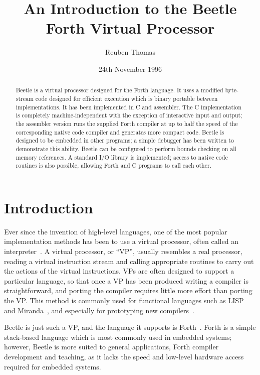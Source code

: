 \documentclass{article}
\title{An Introduction to the Beetle Forth Virtual Processor}
\author{Reuben Thomas}
\date{24th November 1996}
\begin{document}
\maketitle

\begin{abstract}
Beetle is a virtual processor designed for the Forth language. It uses a
modified byte-stream code designed for efficient execution which is binary
portable between implementations. It has been implemented in C and assembler.
The C implementation is completely machine-independent with the exception of
interactive input and output; the assembler version runs the supplied Forth
compiler at up to half the speed of the corresponding native code compiler
and generates more compact code. Beetle is designed to be embedded in other
programs; a simple debugger has been written to demonstrate this ability.
Beetle can be configured to perform bounds checking on all memory references.
A standard I/O library is implemented; access to native code routines is also
possible, allowing Forth and C programs to call each other.
\end{abstract}



\section{Introduction}

Ever since the invention of high-level languages, one of the most popular
implementation methods has been to use a virtual processor, often called an
interpreter~\cite{intcoproc}. A virtual processor, or ``VP'', usually
resembles a real processor, reading a virtual instruction stream and calling
appropriate routines to carry out the actions of the virtual instructions.
VPs are often designed to support a particular language, so that once a
VP has been produced writing a compiler is straightforward, and porting the
compiler requires little more effort than porting the VP. This method is
commonly used for functional languages such as LISP and
Miranda~\cite{lispemul,combreduc}, and especially for prototyping new
compilers~\cite{parscheme,aplgen}.

Beetle is just such a VP, and the language it supports is
Forth~\cite{starting4th}. Forth is a simple stack-based language which is
most commonly used in embedded systems; however, Beetle is more suited to
general applications, Forth compiler development and teaching, as it lacks
the speed and low-level hardware access required for embedded systems.
\end{document}
